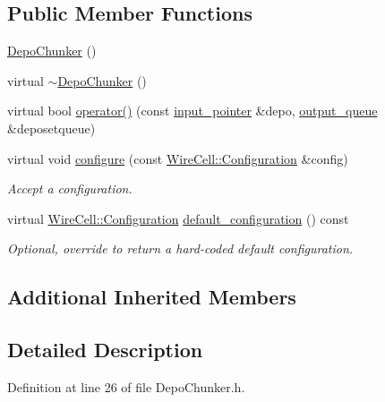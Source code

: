 \subsection*{Public Member Functions}
\begin{DoxyCompactItemize}
\item 
\hyperlink{class_wire_cell_1_1_gen_1_1_depo_chunker_ac7e8f8fe936a1eb546c1f6c990eaf752}{Depo\+Chunker} ()
\item 
virtual \hyperlink{class_wire_cell_1_1_gen_1_1_depo_chunker_aa7601ec6c03fb978cfcde3190bce7c60}{$\sim$\+Depo\+Chunker} ()
\item 
virtual bool \hyperlink{class_wire_cell_1_1_gen_1_1_depo_chunker_a695d04f8e591f88384961d3dafcc8449}{operator()} (const \hyperlink{class_wire_cell_1_1_i_queuedout_node_acf5f716a764553f3c7055a9cf67e906e}{input\+\_\+pointer} \&depo, \hyperlink{class_wire_cell_1_1_i_queuedout_node_a39018e4e3dd886befac9636ac791a685}{output\+\_\+queue} \&deposetqueue)
\item 
virtual void \hyperlink{class_wire_cell_1_1_gen_1_1_depo_chunker_aa9e694cac27f740aed7789ffa9592f43}{configure} (const \hyperlink{namespace_wire_cell_a9f705541fc1d46c608b3d32c182333ee}{Wire\+Cell\+::\+Configuration} \&config)
\begin{DoxyCompactList}\small\item\em Accept a configuration. \end{DoxyCompactList}\item 
virtual \hyperlink{namespace_wire_cell_a9f705541fc1d46c608b3d32c182333ee}{Wire\+Cell\+::\+Configuration} \hyperlink{class_wire_cell_1_1_gen_1_1_depo_chunker_ac865314ea60a3cb9e72237e4cee6ce51}{default\+\_\+configuration} () const
\begin{DoxyCompactList}\small\item\em Optional, override to return a hard-\/coded default configuration. \end{DoxyCompactList}\end{DoxyCompactItemize}
\subsection*{Additional Inherited Members}


\subsection{Detailed Description}


Definition at line 26 of file Depo\+Chunker.\+h.



